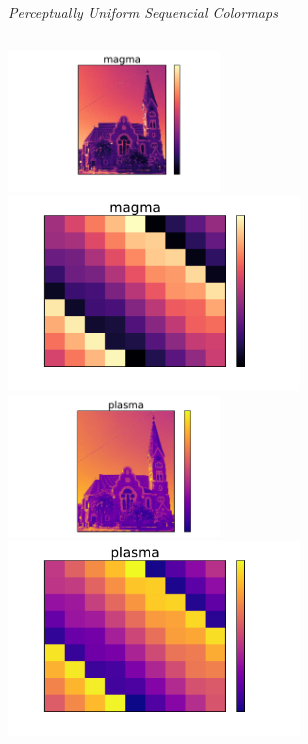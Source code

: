 \documentclass{beamer}
\begin{document}
\begin{frame}
\begin{center}
\textit{Perceptually Uniform Sequencial Colormaps}
\end{center}
\begin{columns}
\begin{column}{0.5\textwidth}
\begin{center}
\vfill
\includegraphics[width=0.42\textwidth]{church_magma.pdf}
\includegraphics[width=0.58\textwidth]{magicsquare_magma.pdf}\newline\newline
\vfill
\includegraphics[width=0.42\textwidth]{church_plasma.pdf}
\includegraphics[width=0.58\textwidth]{magicsquare_plasma.pdf}
\vfill
\end{center}

\end{column}
\end{columns}
\end{frame}
\end{document}
